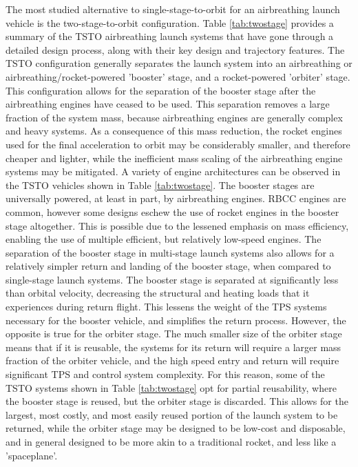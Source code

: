 \noindent
The most studied alternative to single-stage-to-orbit for an airbreathing launch vehicle is the two-stage-to-orbit configuration. Table \ref{tab:twostage} provides a summary of the TSTO airbreathing launch systems that have gone through a detailed design process, along with their key design and trajectory features. The TSTO configuration generally separates the launch system into an airbreathing or airbreathing/rocket-powered 'booster' stage, and a rocket-powered 'orbiter' stage. This configuration allows for the separation of the booster stage after the airbreathing engines have ceased to be used. This separation removes a large fraction of the system mass, because airbreathing engines are generally complex and heavy systems. As a consequence of this mass reduction, the rocket engines used for the final acceleration to orbit may be considerably smaller, and therefore cheaper and lighter, while the inefficient mass scaling of the airbreathing engine systems may be mitigated. 
A variety of engine architectures can be observed in the TSTO vehicles shown in Table \ref{tab:twostage}. The booster stages are universally powered, at least in part, by airbreathing engines. RBCC engines are common, however some designs eschew the use of rocket engines in the booster stage altogether. This is possible due to the lessened emphasis on mass efficiency, enabling the use of multiple efficient, but relatively low-speed engines.
The separation of the booster stage in multi-stage launch systems also allows for a relatively simpler return and landing of the booster stage, when compared to single-stage launch systems. The booster stage is separated at significantly less than orbital velocity, decreasing the structural and heating loads that it experiences during return flight. This lessens the weight of the TPS systems necessary for the booster vehicle, and simplifies the return process.
However, the opposite is true for the orbiter stage. The much smaller size of the orbiter stage means that if it is reusable, the systems for its return will require a larger mass fraction of the orbiter vehicle, and the high speed entry and return will require significant TPS and control system complexity. 
For this reason, some of the TSTO systems shown in Table \ref{tab:twostage} opt for partial reusability, where the booster stage is reused, but the orbiter stage is discarded. This allows for the largest, most costly, and most easily reused portion of the launch system to be returned, while the orbiter stage may be designed to be low-cost and disposable, and in general designed to be more akin to a traditional rocket, and less like a 'spaceplane'. 


